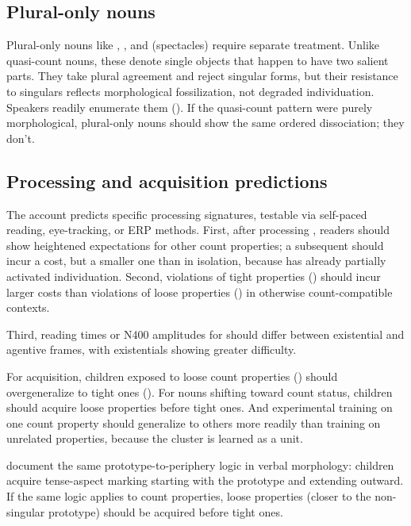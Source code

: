 \documentclass[12pt,a4paper]{article}
\begin{document}
\subsection{Plural-only nouns}

Plural-only nouns like , , and  (spectacles) require separate treatment. Unlike quasi-count nouns, these denote single objects that happen to have two salient parts. They take plural agreement and reject singular forms, but their resistance to singulars reflects morphological fossilization, not degraded individuation. Speakers readily enumerate them (). If the quasi-count pattern were purely morphological, plural-only nouns should show the same ordered dissociation; they don't.

\subsection{Processing and acquisition predictions}

The account predicts specific processing signatures, testable via self-paced reading, eye-tracking, or ERP methods. First, after processing , readers should show heightened expectations for other count properties; a subsequent  should incur a cost, but a smaller one than  in isolation, because  has already partially activated individuation. Second, violations of tight properties () should incur larger costs than violations of loose properties () in otherwise count-compatible contexts.

Third, reading times or N400 amplitudes for  should differ between existential and agentive frames, with existentials showing greater difficulty.

For acquisition, children exposed to loose count properties () should overgeneralize to tight ones (). For nouns shifting toward count status, children should acquire loose properties before tight ones. And experimental training on one count property should generalize to others more readily than training on unrelated properties, because the cluster is learned as a unit.

\textcite{shirai1995} document the same prototype-to-periphery logic in verbal morphology: children acquire tense-aspect marking starting with the prototype and extending outward. If the same logic applies to count properties, loose properties (closer to the non-singular prototype) should be acquired before tight ones.
\end{document}
